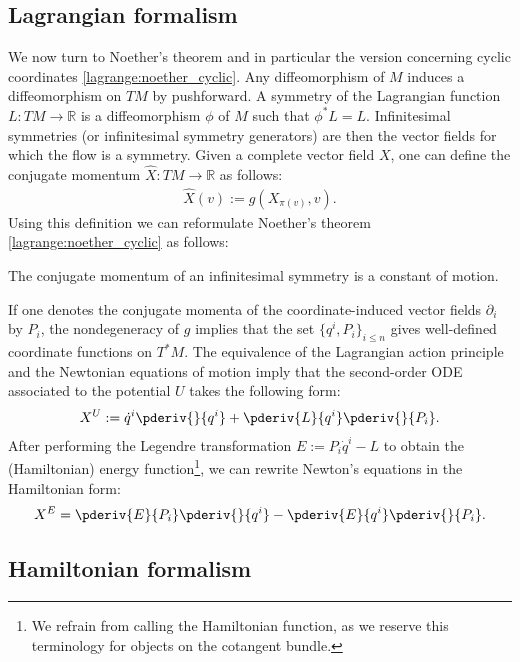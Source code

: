 \subsection{Lagrangian formalism}

    We now turn to Noether's theorem and in particular the version concerning cyclic coordinates \ref{lagrange:noether_cyclic}. Any diffeomorphism of $M$ induces a diffeomorphism on $TM$ by pushforward. A symmetry of the Lagrangian function $L:TM\rightarrow\mathbb{R}$ is a diffeomorphism $\phi$ of $M$ such that $\phi^*L = L$. Infinitesimal symmetries (or infinitesimal symmetry generators) are then the vector fields for which the flow is a symmetry. Given a complete vector field $X$, one can define the conjugate momentum $\widehat{X}:TM\rightarrow\mathbb{R}$ as follows:
    \begin{gather}
        \label{lagrange:metric_conjugate_momentum}
        \widehat{X}(v) := g(X_{\pi(v)}, v).
    \end{gather}
    Using this definition we can reformulate Noether's theorem \ref{lagrange:noether_cyclic} as follows:
    \begin{theorem}
        The conjugate momentum of an infinitesimal symmetry is a constant of motion.
    \end{theorem}

    If one denotes the conjugate momenta of the coordinate-induced vector fields $\partial_i$ by $P_i$, the nondegeneracy of $g$ implies that the set $\{q^i, P_i\}_{i\leq n}$ gives well-defined coordinate functions on $T^*M$. The equivalence of the Lagrangian action principle and the Newtonian equations of motion imply that the second-order ODE associated to the potential $U$ takes the following form:
    \begin{gather}
        X^U := \dot{q}^i\pderiv{}{q^i} + \pderiv{L}{q^i}\pderiv{}{P_i}.
    \end{gather}
    After performing the Legendre transformation $E:=P_i\dot{q}^i-L$ to obtain the (Hamiltonian) energy function\footnote{We refrain from calling the Hamiltonian function, as we reserve this terminology for objects on the cotangent bundle.}, we can rewrite Newton's equations in the Hamiltonian form:
    \begin{gather}
        X^E = \pderiv{E}{P_i}\pderiv{}{q^i}-\pderiv{E}{q^i}\pderiv{}{P_i}.
    \end{gather}

\subsection{Hamiltonian formalism}

